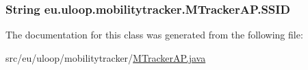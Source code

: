 \hypertarget{classeu_1_1uloop_1_1mobilitytracker_1_1MTrackerAP_a7c07b1020257350bdfb1c7c5f3362dde}{
\subsubsection[{S\+S\+I\+D}]{\setlength{\rightskip}{0pt plus 5cm}String eu.\+uloop.\+mobilitytracker.\+M\+Tracker\+A\+P.\+S\+S\+I\+D\hspace{0.3cm}{\ttfamily [private]}}}\label{classeu_1_1uloop_1_1mobilitytracker_1_1MTrackerAP_a7c07b1020257350bdfb1c7c5f3362dde}


The documentation for this class was generated from the following file\+:\begin{DoxyCompactItemize}
\item 
src/eu/uloop/mobilitytracker/\hyperlink{MTrackerAP_8java}{M\+Tracker\+A\+P.\+java}\end{DoxyCompactItemize}
